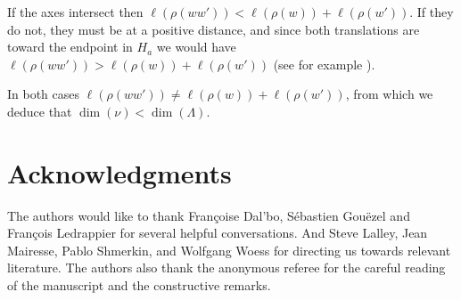 \documentclass{article}
\begin{document}
If the axes intersect then \(\ell(\rho(ww')) < \ell(\rho(w)) + \ell(\rho(w'))\).   If they do not, they must be at a positive distance, and since both translations are toward the endpoint in \(H_a\) we would have \(\ell(\rho(ww')) > \ell(\rho(w)) + \ell(\rho(w'))\) (see for example \cite[Theorem 2.1]{furman}).   

In both cases \(\ell(\rho(ww')) \neq \ell(\rho(w)) + \ell(\rho(w'))\), from which we deduce that \(\dim(\nu) < \dim(\Lambda)\).

\section{Acknowledgments}
The authors would like to thank Françoise Dal'bo, Sébastien Gouëzel and François Ledrappier for several helpful conversations. And Steve Lalley, Jean Mairesse, Pablo Shmerkin, and Wolfgang Woess for directing us towards relevant literature. The authors also thank the anonymous referee for the careful reading of the manuscript and the constructive remarks.


\end{document}
